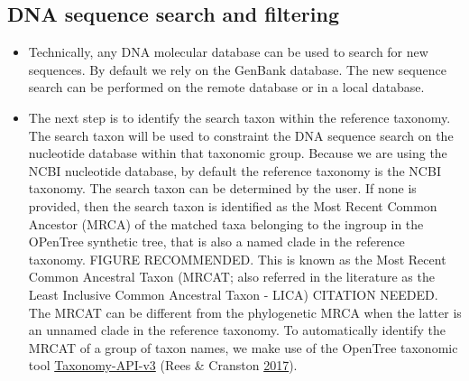 \documentclass[]{article}
\begin{document}
\hypertarget{dna-sequence-search-and-filtering}{%
\subsection{DNA sequence search and filtering}\label{dna-sequence-search-and-filtering}}

\begin{itemize}
\item
  Technically, any DNA molecular database can be used to search for new sequences.
  By default we rely on the GenBank database.
  The new sequence search can be performed on the remote database or in a local database.
\item
  The next step is to identify the search taxon within the reference taxonomy. The search taxon will be used to constraint the DNA sequence search on the nucleotide database within that taxonomic group. Because we are using the NCBI nucleotide database, by default the reference taxonomy is the NCBI taxonomy. The search taxon can be determined by the user. If none is provided, then the search taxon is identified as the Most Recent Common Ancestor (MRCA) of the
  matched taxa belonging to the ingroup in the OPenTree synthetic tree, that is also a named clade in the reference taxonomy. FIGURE RECOMMENDED. This is known as the Most Recent Common
  Ancestral Taxon (MRCAT; also referred in the literature as the Least Inclusive Common Ancestral Taxon - LICA) CITATION NEEDED.
  The MRCAT can be different from the phylogenetic MRCA when the latter is an unnamed clade in the reference taxonomy.
  To automatically identify the MRCAT of a group of taxon names, we make use of the OpenTree taxonomic tool \href{https://github.com/OpenTreeOfLife/germinator/wiki/Taxonomy-API-v3\#mrca}{Taxonomy-API-v3} (Rees \& Cranston \protect\hyperlink{ref-rees2017automated}{2017}).


\end{itemize}
\end{document}
